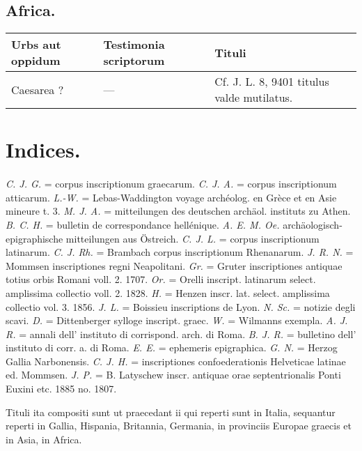\documentclass[a4paper, 11pt, oneside, polutonikogreek, german]{article}
\begin{document}
\subsection{Africa.}
\begin{table}[H]
    \centering
    \begin{tabular}{|p{30mm}|p{20mm}|p{60mm}|}
    \hline
        Urbs aut oppidum & Testimonia scriptorum & Tituli \\ \hline
        Caesarea ? & --- & Cf. J. L. 8, 9401 titulus valde mutilatus. \\ \hline
    \end{tabular}
\end{table}
\clearpage
\section{Indices.}
\paragraph{}
\emph{C. J. G.} = corpus inscriptionum graecarum. \emph{C. J. A.} = corpus inscriptionum atticarum. \emph{L.-W.} = Lebas-Waddington voyage archéolog. en Grèce et en Asie mineure t. 3. \emph{M. J. A.} = mitteilungen des deutschen archäol. instituts zu Athen. \emph{B. C. H.} = bulletin de correspondance hellénique. \emph{A. E. M. Oe.} archäologisch-epigraphische mitteilungen aus Östreich. \emph{C. J. L.} = corpus inscriptionum latinarum. \emph{C. J. Rh.} = Brambach corpus inscriptionum Rhenanarum. \emph{J. R. N.} = Mommsen inscriptiones regni Neapolitani. \emph{Gr.} = Gruter inscriptiones antiquae totius orbis Romani voll. 2. 1707. \emph{Or.} = Orelli inscript. latinarum select. amplissima collectio voll. 2. 1828. \emph{H.} = Henzen inscr. lat. select. amplissima collectio vol. 3. 1856. \emph{J. L.} = Boissieu inscriptions de Lyon. \emph{N. Sc.} = notizie degli scavi. \emph{D.} = Dittenberger sylloge inscript. graec. \emph{W.} = Wilmanns exempla. \emph{A. J. R.} = annali dell' instituto di corrispond. arch. di Roma. \emph{B. J. R.} = bulletino dell' instituto di corr. a. di Roma. \emph{E. E.} = ephemeris epigraphica. \emph{G. N.} = Herzog Gallia Narbonensis. \emph{C. J. H.} = inscriptiones confoederationis Helveticae latinae ed. Mommsen. \emph{J. P.} = B. Latyschew inscr. antiquae orae septentrionalis Ponti Euxini etc. 1885 no. 1807.

Tituli ita compositi sunt ut praecedant ii qui reperti sunt in Italia, sequantur reperti in Gallia, Hispania, Britannia, Germania, in provinciis Europae graecis et in Asia, in Africa.
\end{document}
